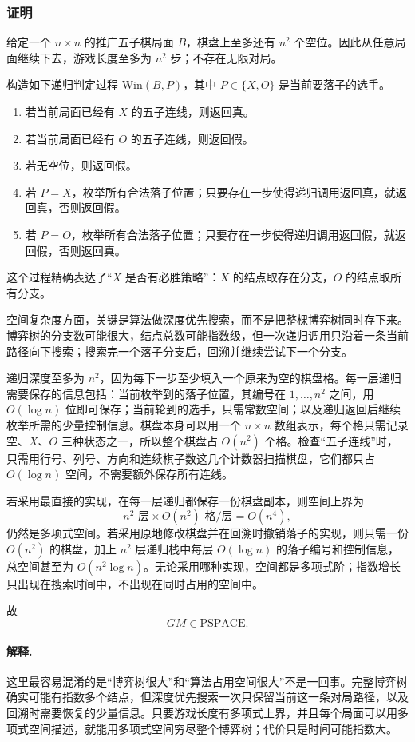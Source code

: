 \begin{answerred}
\subsubsection*{证明}

给定一个 $n\times n$ 的推广五子棋局面 $B$，棋盘上至多还有 $n^2$ 个空位。因此从任意局面继续下去，游戏长度至多为 $n^2$ 步；不存在无限对局。

构造如下递归判定过程 $\mathrm{Win}(B,P)$，其中 $P\in\{X,O\}$ 是当前要落子的选手。
\begin{enumerate}[label=(\arabic*)]
  \item 若当前局面已经有 $X$ 的五子连线，则返回真。
  \item 若当前局面已经有 $O$ 的五子连线，则返回假。
  \item 若无空位，则返回假。
  \item 若 $P=X$，枚举所有合法落子位置；只要存在一步使得递归调用返回真，就返回真，否则返回假。
  \item 若 $P=O$，枚举所有合法落子位置；只要存在一步使得递归调用返回假，就返回假，否则返回真。
\end{enumerate}
这个过程精确表达了“$X$ 是否有必胜策略”：$X$ 的结点取存在分支，$O$ 的结点取所有分支。

空间复杂度方面，关键是算法做深度优先搜索，而不是把整棵博弈树同时存下来。博弈树的分支数可能很大，结点总数可能指数级，但一次递归调用只沿着一条当前路径向下搜索；搜索完一个落子分支后，回溯并继续尝试下一个分支。

递归深度至多为 $n^2$，因为每下一步至少填入一个原来为空的棋盘格。每一层递归需要保存的信息包括：当前枚举到的落子位置，其编号在 $1,\ldots,n^2$ 之间，用 $O(\log n)$ 位即可保存；当前轮到的选手，只需常数空间；以及递归返回后继续枚举所需的少量控制信息。棋盘本身可以用一个 $n\times n$ 数组表示，每个格只需记录空、$X$、$O$ 三种状态之一，所以整个棋盘占 $O(n^2)$ 个格。检查“五子连线”时，只需用行号、列号、方向和连续棋子数这几个计数器扫描棋盘，它们都只占 $O(\log n)$ 空间，不需要额外保存所有连线。

若采用最直接的实现，在每一层递归都保存一份棋盘副本，则空间上界为
\[
n^2\text{ 层}\times O(n^2)\text{ 格/层}=O(n^4),
\]
仍然是多项式空间。若采用原地修改棋盘并在回溯时撤销落子的实现，则只需一份 $O(n^2)$ 的棋盘，加上 $n^2$ 层递归栈中每层 $O(\log n)$ 的落子编号和控制信息，总空间甚至为 $O(n^2\log n)$。无论采用哪种实现，空间都是多项式阶；指数增长只出现在搜索时间中，不出现在同时占用的空间中。

故
\[
GM\in\mathrm{PSPACE}.
\]

\begin{answernote}
\paragraph{解释.}
这里最容易混淆的是“博弈树很大”和“算法占用空间很大”不是一回事。完整博弈树确实可能有指数多个结点，但深度优先搜索一次只保留当前这一条对局路径，以及回溯时需要恢复的少量信息。只要游戏长度有多项式上界，并且每个局面可以用多项式空间描述，就能用多项式空间穷尽整个博弈树；代价只是时间可能指数大。

\end{answernote}
\end{answerred}
